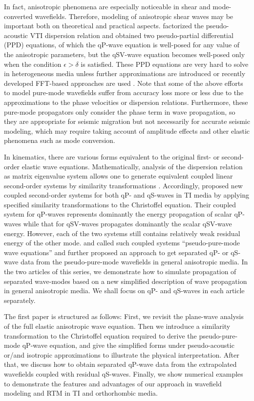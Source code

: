  In fact, anisotropic phenomena are especially noticeable in shear and mode-converted wavefields.
 Therefore, modeling of anisotropic shear waves
may be important both on theoretical and practical aspects. \cite{liu:2009}
 factorized the pseudo-acoustic VTI dispersion relation
 and obtained two pseudo-partial differential (PPD) equations, of which the qP-wave equation
is well-posed for any value of the anisotropic parameters, but the qSV-wave
 equation becomes well-posed only when the condition $\epsilon > \delta$ is satisfied. These PPD equations are very hard
 to solve in heterogeneous media unless further approximations are introduced \cite[]{liu:2009,
 chu:2011} or recently developed FFT-based approaches are used \cite[]{pestana:2011,song.fomel:2011,fomel:2013}.
Note that some of the above efforts to model pure-mode wavefields suffer from accuracy
 loss more or less due to the approximations to the phase velocities or dispersion relations. Furthermore,
these pure-mode propagators only consider the phase term in wave propagation, so they are appropriate
 for seismic migration but not necessarily for accurate seismic modeling, which may require taking account 
of amplitude effects and other elastic phenomena such as mode conversion.

In kinematics, there are various forms equivalent to the original first- or second-order elastic wave equations.
Mathematically, analysis of the dispersion relation as matrix eigenvalue system allows one to generate equivalent
coupled linear second-order systems by similarity transformations \cite[]{fowler:2010}.
Accordingly, \cite{kang.cheng:2011a} proposed new coupled second-order systems for both
qP- and qS-waves
 in TI media by applying specified similarity transformations to the Christoffel equation.
 Their coupled system for qP-waves represents dominantly
the energy propagation of scalar qP-waves while that for qSV-waves 
propagates dominantly the scalar qSV-wave
 energy. However, each of the two systems still contains
 relatively weak residual energy of the other mode. 
\cite{cheng.kang:2012} and \cite{kang.cheng:2012} 
 called such coupled systems ``pseudo-pure-mode wave equations'' and further proposed an approach
to get separated qP- or qS-wave data from the pseudo-pure-mode wavefields in general anisotropic media.
In the two articles of this series, we demonstrate how to simulate propagation of separated wave-modes based on 
a new simplified description of wave propagation in general anisotropic media.
We shall focus on qP- and qS-waves in each article separately.

The first paper is structured as follows: First, we revisit the plane-wave analysis of the full elastic anisotropic
 wave equation. Then we introduce a similarity transformation to the Christoffel equation required to
 derive the pseudo-pure-mode qP-wave equation, and give the simplified forms under pseudo-acoustic or/and isotropic
 approximations to illustrate the physical interpretation.
 After that, we discuss how to obtain separated qP-wave
 data from the extrapolated wavefields coupled with residual qS-waves.
Finally, we show numerical examples
to demonstrate the features and advantages of our approach in wavefield modeling and RTM in 
TI and orthorhombic media.
